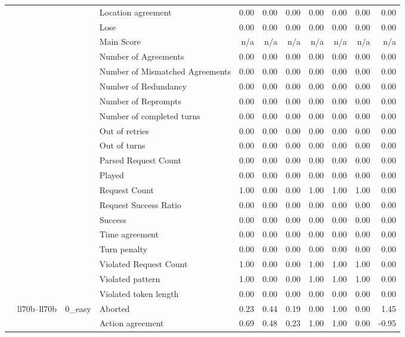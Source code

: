 \begin{tabular}{llllrrrrrrr}
 &  &  & Location agreement & 0.00 & 0.00 & 0.00 & 0.00 & 0.00 & 0.00 & 0.00 \\
 &  &  & Lose & 0.00 & 0.00 & 0.00 & 0.00 & 0.00 & 0.00 & 0.00 \\
 &  &  & Main Score & n/a & n/a & n/a & n/a & n/a & n/a & n/a \\
 &  &  & Number of Agreements & 0.00 & 0.00 & 0.00 & 0.00 & 0.00 & 0.00 & 0.00 \\
 &  &  & Number of Mismatched Agreements & 0.00 & 0.00 & 0.00 & 0.00 & 0.00 & 0.00 & 0.00 \\
 &  &  & Number of Redundancy & 0.00 & 0.00 & 0.00 & 0.00 & 0.00 & 0.00 & 0.00 \\
 &  &  & Number of Reprompts & 0.00 & 0.00 & 0.00 & 0.00 & 0.00 & 0.00 & 0.00 \\
 &  &  & Number of completed turns & 0.00 & 0.00 & 0.00 & 0.00 & 0.00 & 0.00 & 0.00 \\
 &  &  & Out of retries & 0.00 & 0.00 & 0.00 & 0.00 & 0.00 & 0.00 & 0.00 \\
 &  &  & Out of turns & 0.00 & 0.00 & 0.00 & 0.00 & 0.00 & 0.00 & 0.00 \\
 &  &  & Parsed Request Count & 0.00 & 0.00 & 0.00 & 0.00 & 0.00 & 0.00 & 0.00 \\
 &  &  & Played & 0.00 & 0.00 & 0.00 & 0.00 & 0.00 & 0.00 & 0.00 \\
 &  &  & Request Count & 1.00 & 0.00 & 0.00 & 1.00 & 1.00 & 1.00 & 0.00 \\
 &  &  & Request Success Ratio & 0.00 & 0.00 & 0.00 & 0.00 & 0.00 & 0.00 & 0.00 \\
 &  &  & Success & 0.00 & 0.00 & 0.00 & 0.00 & 0.00 & 0.00 & 0.00 \\
 &  &  & Time agreement & 0.00 & 0.00 & 0.00 & 0.00 & 0.00 & 0.00 & 0.00 \\
 &  &  & Turn penalty & 0.00 & 0.00 & 0.00 & 0.00 & 0.00 & 0.00 & 0.00 \\
 &  &  & Violated Request Count & 1.00 & 0.00 & 0.00 & 1.00 & 1.00 & 1.00 & 0.00 \\
 &  &  & Violated pattern & 1.00 & 0.00 & 0.00 & 1.00 & 1.00 & 1.00 & 0.00 \\
 &  &  & Violated token length & 0.00 & 0.00 & 0.00 & 0.00 & 0.00 & 0.00 & 0.00 \\
\cline{2-11} \cline{3-11}
 & \multirow[t]{216}{*}{ll70b--ll70b} & \multirow[t]{27}{*}{0_easy} & Aborted & 0.23 & 0.44 & 0.19 & 0.00 & 1.00 & 0.00 & 1.45 \\
 &  &  & Action agreement & 0.69 & 0.48 & 0.23 & 1.00 & 1.00 & 0.00 & -0.95 \\

\end{tabular}
